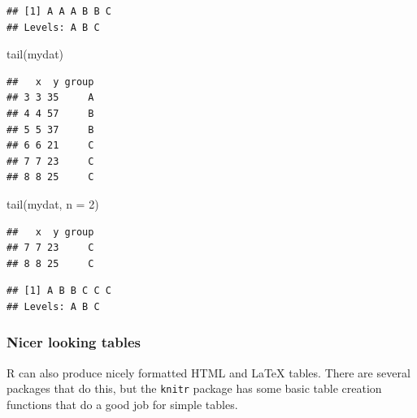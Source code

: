 \documentclass[
]{article}
\newenvironment{Shaded}{\begin{snugshade}}{\end{snugshade}}
\newcommand{\AttributeTok}[1]{\textcolor[rgb]{0.77,0.63,0.00}{#1}}
\newcommand{\DecValTok}[1]{\textcolor[rgb]{0.00,0.00,0.81}{#1}}
\newcommand{\FunctionTok}[1]{\textcolor[rgb]{0.00,0.00,0.00}{#1}}
\newcommand{\NormalTok}[1]{#1}
\newcommand{\SpecialCharTok}[1]{\textcolor[rgb]{0.00,0.00,0.00}{#1}}
\begin{document}
\begin{Shaded}
\end{Shaded}

\begin{verbatim}
## [1] A A A B B C
## Levels: A B C
\end{verbatim}

\begin{Shaded}
\begin{Highlighting}[]
\FunctionTok{tail}\NormalTok{(mydat)}
\end{Highlighting}
\end{Shaded}

\begin{verbatim}
##   x  y group
## 3 3 35     A
## 4 4 57     B
## 5 5 37     B
## 6 6 21     C
## 7 7 23     C
## 8 8 25     C
\end{verbatim}

\begin{Shaded}
\begin{Highlighting}[]
\FunctionTok{tail}\NormalTok{(mydat, }\AttributeTok{n =} \DecValTok{2}\NormalTok{)}
\end{Highlighting}
\end{Shaded}

\begin{verbatim}
##   x  y group
## 7 7 23     C
## 8 8 25     C
\end{verbatim}

\begin{Shaded}
\end{Shaded}

\begin{verbatim}
## [1] A B B C C C
## Levels: A B C
\end{verbatim}

\hypertarget{nicer-looking-tables}{%
\subsubsection{Nicer looking tables}\label{nicer-looking-tables}}

R can also produce nicely formatted HTML and LaTeX tables. There are
several packages that do this, but the \texttt{knitr} package has some basic
table creation functions that do a good job for simple tables.
\end{document}
